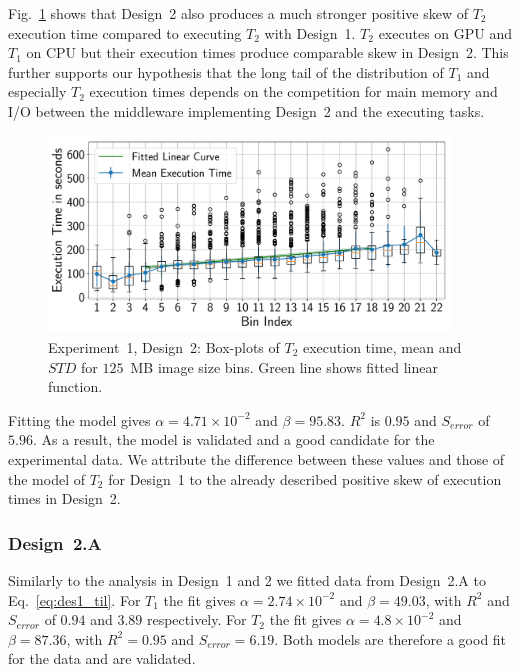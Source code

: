 Fig.~\ref{fig:stage_2_execution_des2} shows that Design~2 also produces a much stronger positive skew of $T_{2}$ execution time compared to executing $T_{2}$ with Design~1.
$T_{2}$ executes on GPU and $T_{1}$ on CPU but their execution times produce comparable skew in Design~2.
This further supports our hypothesis that the long tail of the distribution of $T_{1}$ and especially $T_{2}$ execution times depends on the competition for main memory and I/O between the middleware implementing Design~2 and the executing tasks.


\begin{figure}[H]
    \centering
    \includegraphics[width=0.95\textwidth]{figures/designs/stage_1_tx_box_des2.pdf}
    \caption{Experiment~1, Design~2: Box-plots of $T_{2}$ execution time, mean and $STD$ for $125$~MB image size bins.
        Green line shows fitted linear function.}\label{fig:stage_2_execution_des2}
\end{figure}


Fitting the model gives $\alpha = 4.71 \times 10^{-2}$ and $\beta = 95.83$.
$R^{2}$ is $0.95$ and $S_{error}$ of $5.96$.
As a result, the model is validated and a good candidate for the experimental data.
We attribute the difference between these values and those of the model of $T_{2}$ for Design~1 to the already described positive skew of execution times in Design~2.

\subsubsection{Design~2.A} Similarly to the analysis in Design~1 and 2 we fitted data from Design~2.A to Eq.~\ref{eq:des1_til}.
For $T_{1}$ the fit gives $\alpha=2.74\times10^{-2}$ and $\beta=49.03$, with $R^{2}$ and $S_{error}$ of $0.94$ and $3.89$ respectively.
For $T_{2}$ the fit gives $\alpha=4.8\times10^{-2}$ and $\beta=87.36$, with $R^{2}=0.95$ and $S_{error}=6.19$.
Both models are therefore a good fit for the data and are validated.

